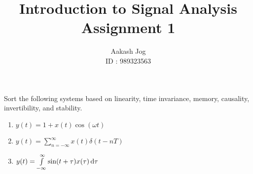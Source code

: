 \documentclass[fleqn, a4paper, 11pt, oneside]{amsart}
\title
[
	Introduction to Signal Analysis : Assignment 1
]
{
	Introduction to Signal Analysis\\
	Assignment 1
}
\author
{
	Aakash Jog\\
	ID : 989323563
}
\date{\formatdate{23}{3}{2016}}
\theoremstyle{definition}
\theoremstyle{theorem}
\begin{document}
\maketitle

\begin{question}
	Sort the following systems based on linearity, time invariance, memory, causality, invertibility, and stability.
	\begin{enumerate}
		\item $y(t) = 1 + x(t) \cos(\omega t)$
		\item $y(t) = \sum\limits_{n = -\infty}^{\infty} x(t) \delta(t - n T)$
		\item $y(t) = \int\limits_{-\infty}^{\infty} \sin(t + \tau) x(\tau) \dif \tau$
	\end{enumerate}
\end{question}
\end{document}
